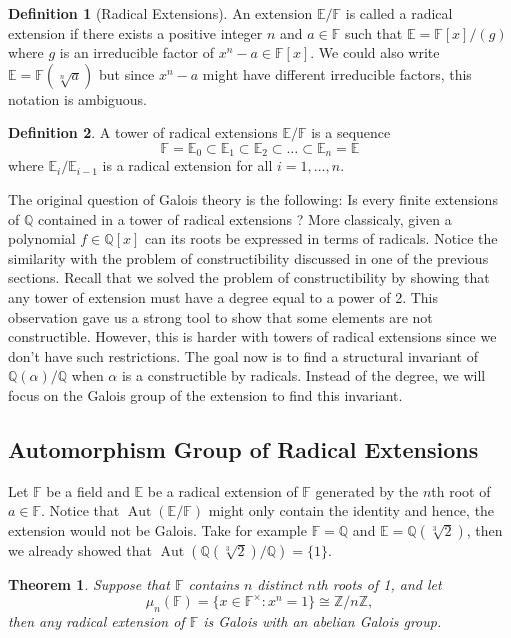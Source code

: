 \documentclass{article}
\theoremstyle{plain}
\newtheorem{theorem}{Theorem}[subsection]
\theoremstyle{definition}
\newtheorem*{definition}{Definition}
\newcommand{\Q}{\mathbb{Q}}
\newcommand{\F}{\mathbb{F}}
\newcommand{\E}{\mathbb{E}}
\newcommand{\Zn}[1]{\mathbb{Z}/ #1 \mathbb{Z}}
\DeclareMathOperator{\Aut}{Aut}
\newcommand{\isomorphic}{\cong}
\begin{document}
\begin{definition}[Radical Extensions]
    An extension $\E / \F$ is called a radical extension if there exists a positive integer $n$ and $a \in \F$ such that $\E = \F[x]/(g)$ where $g$ is an irreducible factor of $x^n - a \in \F[x]$. We could also write $\E = \F(\sqrt[n]{a})$ but since $x^n - a$ might have different irreducible factors, this notation is ambiguous.
\end{definition}

\begin{definition}
    A tower of radical extensions $\E / \F$ is a sequence
    $$\F = \E_0 \subset \E_1 \subset \E_2 \subset \dots \subset \E_n = \E$$
    where $\E_i / \E_{i-1}$ is a radical extension for all $i=1, ..., n$.
\end{definition}

The original question of Galois theory is the following: Is every finite extensions of $\Q$ contained in a tower of radical extensions ? More classicaly, given a polynomial $f \in \Q[x]$ can its roots be expressed in terms of radicals. Notice the similarity with the problem of constructibility discussed in one of the previous sections. Recall that we solved the problem of constructibility by showing that any tower of extension must have a degree equal to a power of 2. This observation gave us a strong tool to show that some elements are not constructible. However, this is harder with towers of radical extensions since we don't have such restrictions. The goal now is to find a structural invariant of $\Q(\alpha) / \Q$ when $\alpha$ is a constructible by radicals. Instead of the degree, we will focus on the Galois group of the extension to find this invariant.

\subsection{Automorphism Group of Radical Extensions}

Let $\F$ be a field and $\E$ be a radical extension of $\F$ generated by the $n$th root of $a \in \F$. Notice that $\Aut(\E / \F)$ might only contain the identity and hence, the extension would not be Galois. Take for example $\F = \Q$ and $\E = \Q(\sqrt[3]{2})$, then we already showed that $\Aut(\Q(\sqrt[3]{2})/ \Q) = \{1\}$.

\begin{theorem}
    Suppose that $\F$ contains $n$ distinct $n$th roots of 1, and let
    $$\mu_n(\F) = \{x \in \F^{\times} : x^n = 1\} \isomorphic \Zn{n},$$
    then any radical extension of $\F$ is Galois with an abelian Galois group.
\end{theorem}
\end{document}
